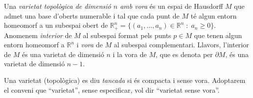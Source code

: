 \documentclass[../main.tex]{subfiles}
\begin{document}
\begin{defi}
\label{def:varietattopologicaambvora} Una \textit{varietat topològica de dimensió $n$ amb vora} és un espai de Hausdorff $M$ que admet una base d'oberts numerable i tal que cada punt de $M$ té algun entorn homeomorf a un subespai obert de $\mathbb{R}^n_+=\{(a_1,\ldots,a_n)\in\mathbb{R}^n\;:\;a_n\geq 0\}$. Anomenem \textit{interior}\label{def:interior} de $M$ al subespai format pels punts $p\in M$ que tenen algun entorn homeomorf a $\mathbb{R}^n$ i \textit{vora}\label{def:vora} de $M$ al subespai complementari. Llavors, l'interior de $M$ és una varietat de dimensió $n$ i la vora de $M$, que es denota per $\partial M$, és una varietat de dimensió $n-1$.
\end{defi}

\begin{defi}
\label{def:varietattancada} Una varietat (topològica) es diu \textit{tancada} si és compacta i sense vora. Adoptarem el conveni que ``varietat'', sense especificar, vol dir ``varietat sense vora''.
\end{defi}
\end{document}
